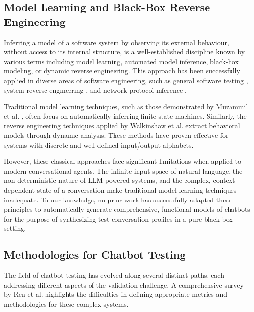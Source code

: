 \subsection{Model Learning and Black-Box Reverse Engineering}

Inferring a model of a software system by observing its external behaviour,
without access to its internal structure,
is a well-established discipline known by various terms including
model learning, automated model inference, black-box modeling, or dynamic reverse engineering.
This approach has been successfully applied in diverse areas of software engineering,
such as general software testing \autocite{aichernigModelLearningModelBased2018},
system reverse engineering \autocite{hajipourIReEnReverseEngineeringBlackBox2021, menguyBlackboxCodeAnalysis2023},
and network protocol inference \autocite{luoDynPREProtocolReverse}.

Traditional model learning techniques,
such as those demonstrated by Muzammil et al. \autocite{shahbazAnalysisTestingBlackbox2014},
often focus on automatically inferring finite state machines.
Similarly, the reverse engineering techniques applied by Walkinshaw et al. \autocite{walkinshawReverseEngineeringSoftwareBehavior2013}
extract behavioral models through dynamic analysis.
These methods have proven effective for systems with discrete and well-defined input/output alphabets.

However, these classical approaches
face significant limitations when applied to modern conversational agents.
The infinite input space of natural language,
the non-deterministic nature of \ac{LLM}-powered systems,
and the complex, context-dependent state of a conversation
make traditional model learning techniques inadequate.
To our knowledge,
no prior work has successfully adapted these principles
to automatically generate comprehensive, functional models of chatbots
for the purpose of synthesizing test conversation profiles
in a pure black-box setting.

\subsection{Methodologies for Chatbot Testing}

The field of chatbot testing has evolved along several distinct paths,
each addressing different aspects of the validation challenge.
A comprehensive survey by Ren et al. \autocite{renEvaluationTechniquesChatbot2019} highlights the difficulties
in defining appropriate metrics and methodologies for these complex systems.

